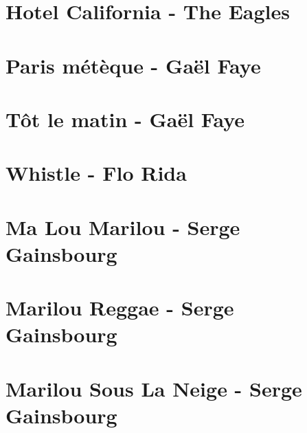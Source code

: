 \documentclass{guitartabs}
\begin{document}
\section{Hotel California - The Eagles}
\begin{guitar}

\end{guitar}


\section{Paris métèque - Gaël Faye}
\begin{guitar}

\end{guitar}


\section{Tôt le matin - Gaël Faye}
\begin{guitar}

\end{guitar}

\section{Whistle - Flo Rida}
\begin{guitar}

\end{guitar}


\section{Ma Lou Marilou - Serge Gainsbourg}
\begin{guitar}

\end{guitar}

\section{Marilou Reggae - Serge Gainsbourg}
\begin{guitar}

\end{guitar}

\section{Marilou Sous La Neige - Serge Gainsbourg}
\begin{guitar}

\end{guitar}
\end{document}
